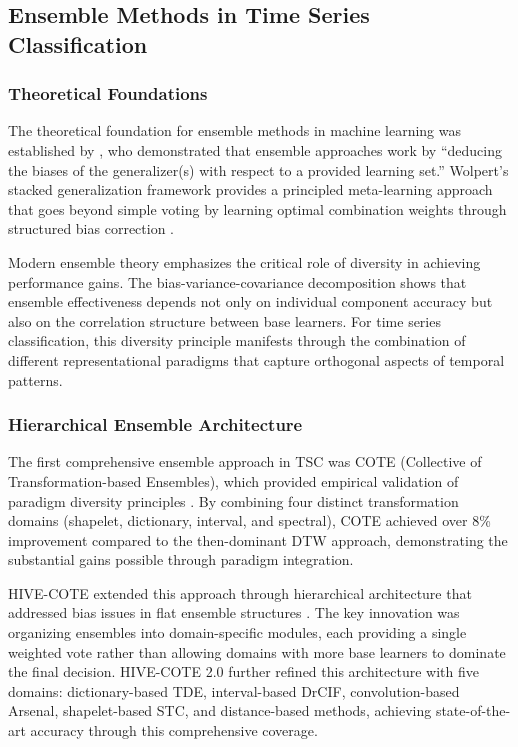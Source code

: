 \documentclass[pdflatex,sn-basic]{sn-jnl}           %
\theoremstyle{thmstyleone}%
\theoremstyle{thmstyletwo}%
\theoremstyle{thmstylethree}%
\begin{document}
\subsection{Ensemble Methods in Time Series Classification}

\subsubsection{Theoretical Foundations}

The theoretical foundation for ensemble methods in machine learning was established by \citet[p.~241]{stacked-generalization}, who demonstrated that ensemble approaches work by ``deducing the biases of the generalizer(s) with respect to a provided learning set.'' Wolpert's stacked generalization framework provides a principled meta-learning approach that goes beyond simple voting by learning optimal combination weights through structured bias correction \citep[p.~242]{stacked-generalization}.

Modern ensemble theory emphasizes the critical role of diversity in achieving performance gains. The bias-variance-covariance decomposition shows that ensemble effectiveness depends not only on individual component accuracy but also on the correlation structure between base learners. For time series classification, this diversity principle manifests through the combination of different representational paradigms that capture orthogonal aspects of temporal patterns.

\subsubsection{Hierarchical Ensemble Architecture}

The first comprehensive ensemble approach in TSC was COTE (Collective of Transformation-based Ensembles), which provided empirical validation of paradigm diversity principles \citep[p.~609]{tsc-bakeoff}. By combining four distinct transformation domains (shapelet, dictionary, interval, and spectral), COTE achieved over 8\% improvement compared to the then-dominant DTW approach, demonstrating the substantial gains possible through paradigm integration.

HIVE-COTE extended this approach through hierarchical architecture that addressed bias issues in flat ensemble structures \citep[p.~7]{hive-cote}. The key innovation was organizing ensembles into domain-specific modules, each providing a single weighted vote rather than allowing domains with more base learners to dominate the final decision. HIVE-COTE 2.0 \citep[p.~3]{hive-cote-2} further refined this architecture with five domains: dictionary-based TDE, interval-based DrCIF, convolution-based Arsenal, shapelet-based STC, and distance-based methods, achieving state-of-the-art accuracy through this comprehensive coverage.
\end{document}
